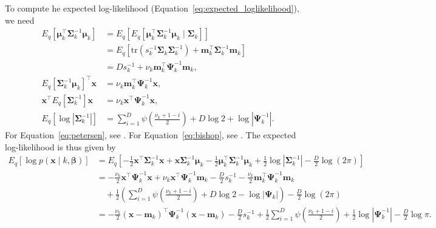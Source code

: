 \documentclass[a4paper]{article}
\begin{document}
			To compute he expected log-likelihood (Equation~\ref{eq:expected_loglikelihood}), we need
			\begin{align}
				E_q\left[ \bm{\mu}_k^\top \bm{\Sigma}_k^{-1} \bm{\mu}_k \right]
				&= E_q\left[ E_q\left[ \bm{\mu}_k^\top \bm{\Sigma}_k^{-1} \bm{\mu}_k \mid \bm{\Sigma}_k \right] \right] \\
				\label{eq:petersen}
				&= E_q\left[ \text{tr}\left(s_k^{-1}\bm{\Sigma}_k\bm{\Sigma}_{k}^{-1}\right) + \mathbf{m}_k^\top \bm{\Sigma}_k^{-1} \mathbf{m}_k\right] \\
				&= Ds_k^{-1} + \nu_k \mathbf{m}_k^\top \bm{\Psi}_k^{-1} \mathbf{m}_k, \\
				E_q\left[\bm{\Sigma}_k^{-1} \bm{\mu}_k \right]^\top \mathbf{x}
				&= \nu_k \mathbf{m}_k^\top \bm{\Psi}_k^{-1} \mathbf{x}, \\
				\mathbf{x}^\top E_q\left[ \bm{\Sigma}_k^{-1} \right] \mathbf{x}
				&= \nu_k \mathbf{x}^\top \bm{\Psi}_k^{-1} \mathbf{x}, \\
				\label{eq:bishop}
				E_q\left[\log |\bm{\Sigma}_k^{-1}|\right]
				&= \sum_{i = 1}^D \psi\left( \frac{\nu_k + 1 - i}{2} \right) + D\log 2 + \log|\bm{\Psi}_k^{-1}|.
			\end{align}
			For Equation~\ref{eq:petersen}, see \cite{Petersen:2008}. For Equation~\ref{eq:bishop}, see \cite{Bishop:2006}.
			The expected log-likelihood is thus given by
			\begin{align}
				E_q\left[ \log p(\mathbf{x} \mid k, \bm{\beta}) \right]
				&= E_q\left[ -\frac{1}{2}\mathbf{x}^\top \bm{\Sigma}_k^{-1} \mathbf{x} + \mathbf{x}\bm{\Sigma}_k^{-1} \bm{\mu}_k - \frac{1}{2}\bm{\mu}_k^\top \bm{\Sigma}_k^{-1} \bm{\mu}_k + \frac{1}{2} \log |\bm{\Sigma}_k^{-1}| - \frac{D}{2}\log(2\pi)\right] \\
				&= - \frac{\nu_k}{2} \mathbf{x}^\top \bm{\Psi}_k^{-1} \mathbf{x} + \nu_k \mathbf{x}^\top \bm{\Psi}_k^{-1} \mathbf{m}_k
				- \frac{D}{2} s_k^{-1} - \frac{\nu_k}{2} \mathbf{m}_k^\top \bm{\Psi}_k^{-1} \mathbf{m}_k \\
				&\quad + \frac{1}{2} \left(\sum_{i = 1}^D \psi\left( \frac{\nu_k + 1 - i}{2} \right) + D \log 2 - \log|\bm{\Psi}_k| \right)
				- \frac{D}{2} \log(2\pi) \\
				&= - \frac{\nu_k}{2} (\mathbf{x} - \mathbf{m}_k)^\top \bm{\Psi}_k^{-1} (\mathbf{x} - \mathbf{m}_k)
				- \frac{D}{2} s_k^{-1} + \frac{1}{2} \sum_{i = 1}^D \psi\left( \frac{\nu_k + 1 - i}{2} \right) + \frac{1}{2} \log|\bm{\Psi}_k^{-1}|
				- \frac{D}{2} \log\pi.
			\end{align}

	
	
\end{document}
